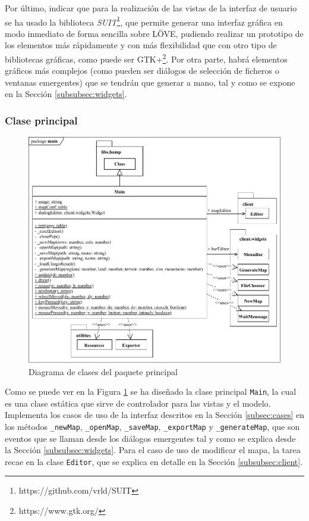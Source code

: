 Por último, indicar que para la realización de las vistas de la interfaz de usuario se ha usado la biblioteca \textit{SUIT}\footnote{https://github.com/vrld/SUIT}, que permite generar una interfaz gráfica en modo inmediato de forma sencilla sobre LÖVE, pudiendo realizar un prototipo de los elementos más rápidamente y con más flexibilidad que con otro tipo de bibliotecas gráficas, como puede ser GTK+\footnote{https://www.gtk.org/}. Por otra parte, habrá elementos gráficos más complejos (como pueden ser diálogos de selección de ficheros o ventanas emergentes) que se tendrán que generar a mano, tal y como se expone en la Sección \ref{subsubsec:widgets}.

\subsubsection{Clase principal}
\label{subsubsec:main}

\begin{figure}[!h]
	\centering
	\includegraphics[width=\textwidth]{images/clase-principal.pdf}
	\caption{Diagrama de clases del paquete principal}
	\label{fig:mainclass}
\end{figure}

Como se puede ver en la Figura \ref{fig:mainclass} se ha diseñado la clase principal \texttt{Main}, la cual es una clase estática que sirve de controlador para las vistas y el modelo. Implementa los casos de uso de la interfaz descritos en la Sección \ref{subsec:cases} en los métodos \texttt{\_newMap}, \texttt{\_openMap}, \texttt{\_saveMap}, \texttt{\_exportMap} y \texttt{\_generateMap}, que son eventos que se llaman desde los diálogos emergentes tal y como se explica desde la Sección \ref{subsubsec:widgets}. Para el caso de uso de modificar el mapa, la tarea recae en la clase \texttt{Editor}, que se explica en detalle en la Sección \ref{subsubsec:client}. \\

